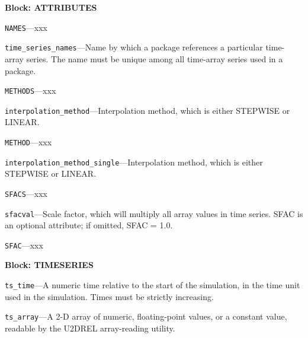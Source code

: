 
\item \textbf{Block: ATTRIBUTES}

\begin{description}
\item \texttt{NAMES}---xxx

\item \texttt{time\_series\_names}---Name by which a package references a particular time-array series. The name must be unique among all time-array series used in a package.

\item \texttt{METHODS}---xxx

\item \texttt{interpolation\_method}---Interpolation method, which is either STEPWISE or LINEAR.

\item \texttt{METHOD}---xxx

\item \texttt{interpolation\_method\_single}---Interpolation method, which is either STEPWISE or LINEAR.

\item \texttt{SFACS}---xxx

\item \texttt{sfacval}---Scale factor, which will multiply all array values in time series. SFAC is an optional attribute; if omitted, SFAC = 1.0.

\item \texttt{SFAC}---xxx

\end{description}
\item \textbf{Block: TIMESERIES}

\begin{description}
\item \texttt{ts\_time}---A numeric time relative to the start of the simulation, in the time unit used in the simulation. Times must be strictly increasing.

\item \texttt{ts\_array}---A 2-D array of numeric, floating-point values, or a constant value, readable by the U2DREL array-reading utility.

\end{description}

